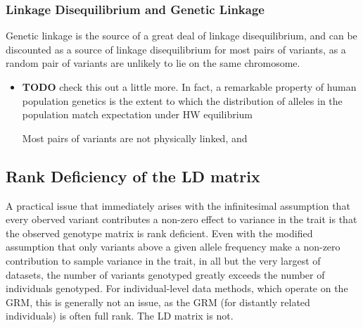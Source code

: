 \subsubsection{Linkage Disequilibrium and Genetic Linkage}\label{sec:orgd025d4b}

Genetic linkage is the source of a great deal of linkage disequilibrium, and can be discounted as a source of linkage disequilibrium for most pairs of variants, as a random pair of variants are unlikely to lie on the same chromosome.  
\begin{itemize}
\item {\bfseries\sffamily TODO} check this out a little more.\label{sec:orgc90530a}
In fact, a remarkable property of human population genetics is the extent to which the distribution of alleles in the population match expectation under HW equilibrium

Most pairs of variants are not physically linked, and
\end{itemize}

\subsection{Rank Deficiency of the LD matrix}\label{sec:org48c0ea3}

A practical issue that immediately arises with the infinitesimal assumption that every oberved variant contributes a non-zero effect to variance in the trait is that the observed genotype matrix is rank deficient.  Even with the modified assumption
that only variants above a given allele frequency make a non-zero contribution to sample variance in the trait, in all but the very largest of datasets, the number of variants genotyped greatly exceeds the number of individuals genotyped.  For individual-level
data methods, which operate on the GRM, this is generally not an issue, as the GRM (for distantly related individuals) is often full rank.  The LD matrix is not.



